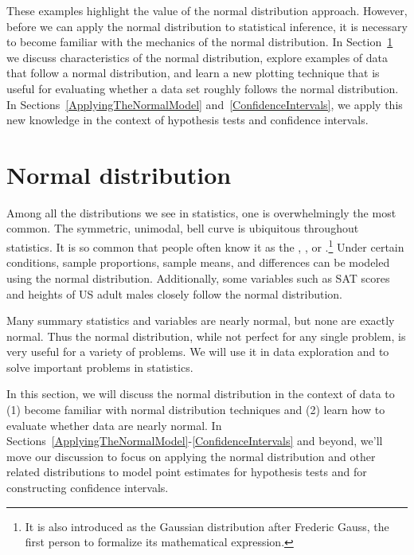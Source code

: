 These examples highlight the value of the normal distribution approach. However, before we can apply the normal distribution to statistical inference, it is necessary to become familiar with the mechanics of the normal distribution. In Section~\ref{normalDist} we discuss characteristics of the normal distribution, explore examples of data that follow a normal distribution, and learn a new plotting technique that is useful for evaluating whether a data set roughly follows the normal distribution. In Sections~\ref{ApplyingTheNormalModel} and~\ref{ConfidenceIntervals}, we apply this new knowledge in the context of hypothesis tests and confidence intervals.


\section{Normal distribution}
\label{normalDist}


Among all the distributions we see in statistics, one is overwhelmingly the most common. The symmetric, unimodal, bell curve is ubiquitous throughout statistics. It is so common that people often know it as the , , or .\footnote{It is also introduced as the Gaussian distribution after Frederic Gauss, the first person to formalize its mathematical expression.} Under certain conditions, sample proportions, sample means, and differences can be modeled using the normal distribution. Additionally, some variables such as SAT scores and heights of US adult males closely follow the normal distribution.

\begin{termBox}{
Many summary statistics and variables are nearly normal, but none are exactly normal. Thus the normal distribution, while not perfect for any single problem, is very useful for a variety of problems. We will use it in data exploration and to solve important problems in statistics.\vspace{0.7mm}}
\end{termBox}

In this section, we will discuss the normal distribution in the context of data to (1) become familiar with normal distribution techniques and (2) learn how to evaluate whether data are nearly normal. In Sections~\ref{ApplyingTheNormalModel}-\ref{ConfidenceIntervals} and beyond, we'll move our discussion to focus on applying the normal distribution and other related distributions to model point estimates for hypothesis tests and for constructing confidence intervals.

